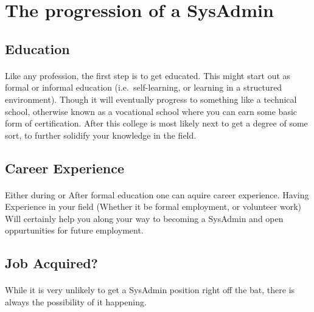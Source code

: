 \section{The progression of a SysAdmin}

\subsection{Education}
\paragraph{}
Like any profession, the first step is to get educated. This might start out as
formal or informal education (i.e.\ self-learning, or learning in a structured
environment). Though it will eventually progress to something like a technical
school, otherwise known as a vocational school where you can earn some basic
form of certification. After this college is most likely next to get a degree
of some sort, to further solidify your knowledge in the field.
\par

\subsection{Career Experience}
\paragraph{}
Either during or After formal education one can aquire career experience.
Having Experience in your field (Whether it be formal employment, or volunteer
work) Will certainly help you along your way to becoming a SysAdmin and open
oppurtunities for future employment.
\par

\subsection{Job Acquired?}
\paragraph{}
While it is very unlikely to get a SysAdmin position right off the bat, there is
always the possibility of it happening.
\par

\printbibliography{}
